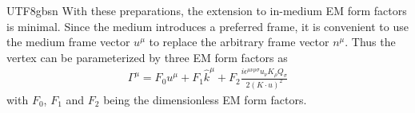 \documentclass[11pt]{article}\def\baselinestretch{1.4}
\def\e{{\epsilon}}
\def\G{{\Gamma}}
\def\m{{\mu}}
\def\n{{\nu}}
\def\r{{\rho}}
\def\s{{\sigma}}
\begin{document}
\begin{CJK}{UTF8}{gbsn}
With these preparations, the extension to in-medium EM form factors is minimal. Since the medium introduces a preferred frame, it is convenient to use the medium frame vector $u^\m$ to replace the arbitrary frame vector $n^\m$. Thus the vertex can be parameterized by three EM form factors as
\begin{align}%
\G^\m=F_0u^\m+F_1\hat{k}^\m+F_2\frac{i\e^{\m\n\r\s}u_\n K_\r Q_\s}{2(K\cdot u)^2} \label{parameterization}
\end{align}
with $F_0$, $F_1$ and $F_2$ being the dimensionless EM form factors.


\end{CJK}
\end{document}

